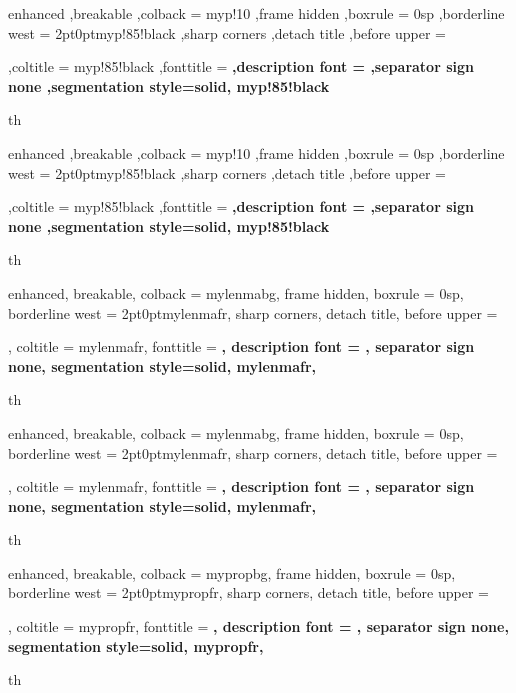 {%
  enhanced
  ,breakable
  ,colback = myp!10
  ,frame hidden
  ,boxrule = 0sp
  ,borderline west = {2pt}{0pt}{myp!85!black}
  ,sharp corners
  ,detach title
  ,before upper = \tcbtitle\par\smallskip
  ,coltitle = myp!85!black
  ,fonttitle = \bfseries\sffamily
  ,description font = \mdseries
  ,separator sign none
  ,segmentation style={solid, myp!85!black}
}
{th}
{%
  enhanced
  ,breakable
  ,colback = myp!10
  ,frame hidden
  ,boxrule = 0sp
  ,borderline west = {2pt}{0pt}{myp!85!black}
  ,sharp corners
  ,detach title
  ,before upper = \tcbtitle\par\smallskip
  ,coltitle = myp!85!black
  ,fonttitle = \bfseries\sffamily
  ,description font = \mdseries
  ,separator sign none
  ,segmentation style={solid, myp!85!black}
}
{th}



{%
  enhanced,
  breakable,
  colback = mylenmabg,
  frame hidden,
  boxrule = 0sp,
  borderline west = {2pt}{0pt}{mylenmafr},
  sharp corners,
  detach title,
  before upper = \tcbtitle\par\smallskip,
  coltitle = mylenmafr,
  fonttitle = \bfseries\sffamily,
  description font = \mdseries,
  separator sign none,
  segmentation style={solid, mylenmafr},
}
{th}

{%
  enhanced,
  breakable,
  colback = mylenmabg,
  frame hidden,
  boxrule = 0sp,
  borderline west = {2pt}{0pt}{mylenmafr},
  sharp corners,
  detach title,
  before upper = \tcbtitle\par\smallskip,
  coltitle = mylenmafr,
  fonttitle = \bfseries\sffamily,
  description font = \mdseries,
  separator sign none,
  segmentation style={solid, mylenmafr},
}
{th}



{%
  enhanced,
  breakable,
  colback = mypropbg,
  frame hidden,
  boxrule = 0sp,
  borderline west = {2pt}{0pt}{mypropfr},
  sharp corners,
  detach title,
  before upper = \tcbtitle\par\smallskip,
  coltitle = mypropfr,
  fonttitle = \bfseries\sffamily,
  description font = \mdseries,
  separator sign none,
  segmentation style={solid, mypropfr},
}
{th}

